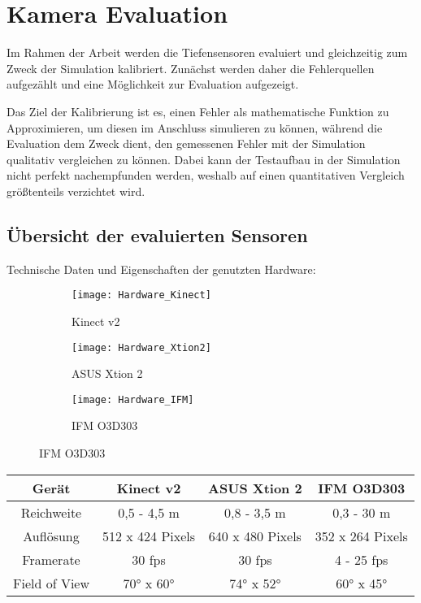 \documentclass[thesis.tex]{subfiles}
\begin{document}
\chapter{Kamera Evaluation}
\label{chap:cameraevaluation}

Im Rahmen der Arbeit werden die Tiefensensoren evaluiert und gleichzeitig zum Zweck der Simulation kalibriert. Zunächst werden daher die Fehlerquellen aufgezählt und eine Möglichkeit zur Evaluation aufgezeigt.

Das Ziel der Kalibrierung ist es, einen Fehler als mathematische Funktion zu Approximieren, um diesen im Anschluss simulieren zu können, während die Evaluation dem Zweck dient, den gemessenen Fehler mit der Simulation qualitativ vergleichen zu können. Dabei kann der Testaufbau in der Simulation nicht perfekt nachempfunden werden, weshalb auf einen quantitativen Vergleich größtenteils verzichtet wird.

\section{Übersicht der evaluierten Sensoren}
Technische Daten und Eigenschaften der genutzten Hardware:

\begin{figure}[h]
\centering
\begin{subfigure}{.32\textwidth}
    \centering
    \texttt{[image: Hardware\_Kinect]}
    \caption{Kinect v2}
\end{subfigure}%
\begin{subfigure}{.32\textwidth}
    \centering
    \texttt{[image: Hardware\_Xtion2]}
    \caption{ASUS Xtion 2}
\end{subfigure}
\begin{subfigure}{.32\textwidth}
    \centering
    \texttt{[image: Hardware\_IFM]}
    \caption{IFM O3D303}
\end{subfigure}
\end{figure}

\begin{tabular}{|c|c|c|c|}
\hline
Gerät & Kinect v2 & ASUS Xtion 2 & IFM O3D303 \\
\hline
Reichweite & 0,5 - 4,5 m & 0,8 - 3,5 m & 0,3 - 30 m \\
Auflösung & 512 x 424 Pixels & 640 x 480 Pixels & 352 x 264 Pixels \\
Framerate & 30 fps & 30 fps & 4 - 25 fps  \\
Field of View & \ang{70} x \ang{60} & \ang{74} x \ang{52} & \ang{60} x \ang{45}\\
\hline
\end{tabular}
\end{document}
